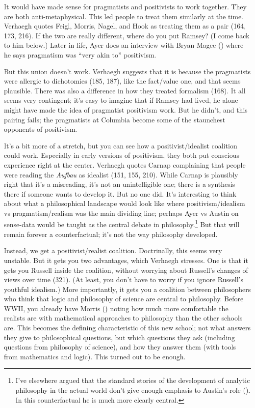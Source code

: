\documentclass[
  11pt,
  letterpaper,
  DIV=11,
  numbers=noendperiod,
  twoside]{scrartcl}
\begin{document}
It would have made sense for pragmatists and positivists to work
together. They are both anti-metaphysical. This led people to treat them
similarly at the time. Verhaegh quotes Feigl, Morris, Nagel, and Hook as
treating them as a pair (164, 173, 216). If the two are really
different, where do you put Ramsey? (I come back to him below.) Later in
life, Ayer does an interview with Bryan Magee
() where he says
pragmatism was ``very akin to'' positivism.

But this union doesn't work. Verhaegh suggests that it is because the
pragmatists were allergic to dichotomies (185, 187), like the fact/value
one, and that seems plausible. There was also a difference in how they
treated formalism (168). It all seems very contingent; it's easy to
imagine that if Ramsey had lived, he alone might have made the idea of
pragmatist positivism work. But he didn't, and this pairing fails; the
pragmatists at Columbia become some of the staunchest opponents of
positivism.

It's a bit more of a stretch, but you can see how a positivist/idealist
coalition could work. Especially in early versions of positivism, they
both put conscious experience right at the center. Verhaegh quotes
Carnap complaining that people were reading the \emph{Aufbau} as
idealist (151, 155, 210). While Carnap is plausibly right that it's a
misreading, it's not an unintelligible one; there is a synthesis there
if someone wants to develop it. But no one did. It's interesting to
think about what a philosophical landscape would look like where
positivism/idealism vs pragmatism/realism was the main dividing line;
perhaps Ayer vs Austin on sense-data would be taught as the central
debate in philosophy.\footnote{I've elsewhere argued that the standard
  stories of the development of analytic philosophy in the actual world
  don't give enough emphasis to Austin's role
  (). In this
  counterfactual he is much more clearly central.} But that will remain
forever a counterfactual; it's not the way philosophy developed.

Instead, we get a positivist/realist coalition. Doctrinally, this seems
very unstable. But it gets you two advantages, which Verhaegh stresses.
One is that it gets you Russell inside the coalition, without worrying
about Russell's changes of views over time (321). (At least, you don't
have to worry if you ignore Russell's youthful idealism.) More
importantly, it gets you a coalition between philosophers who think that
logic and philosophy of science are central to philosophy. Before WWII,
you already have Morris () noting how
much more comfortable the realists are with mathematical approaches to
philosophy than the other schools are. This becomes the defining
characteristic of this new school; not what answers they give to
philosophical questions, but which questions they ask (including
questions from philosophy of science), and how they answer them (with
tools from mathematics and logic). This turned out to be enough.
\end{document}
